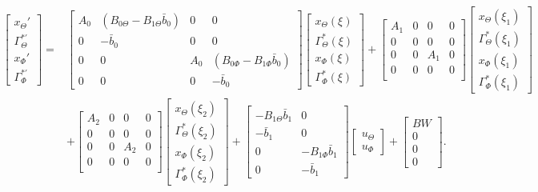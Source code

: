 \documentclass[main.tex]{subfiles}
\begin{document}
\begin{align}
\begin{bmatrix}
x_\Theta' \\
\Gamma_\Theta^{*'} \\
x_\Phi' \\
\Gamma_\Phi^{*'} 
\end{bmatrix} =&
\begin{bmatrix}
A_0 & (B_{0\Theta} - B_{1\Theta} \bar{b}_0) & 0 & 0\\
0 & -\bar{b}_0 & 0 & 0 \\
0 & 0 & A_0 & (B_{0\Phi} - B_{1\Phi} \bar{b}_0)\\
0 & 0 & 0 & -\bar{b}_0
\end{bmatrix}
\begin{bmatrix}
x_\Theta(\xi) \\
\Gamma_\Theta^{*}(\xi) \\
x_\Phi(\xi) \\
\Gamma_\Phi^{*} (\xi)
\end{bmatrix} + 
\begin{bmatrix}
A_1 & 0 & 0 & 0\\
0 & 0 & 0 & 0 \\
0 & 0 & A_1 & 0 \\
0 & 0 & 0 & 0 \\
\end{bmatrix}
\begin{bmatrix}
x_\Theta(\xi_1) \\
\Gamma_\Theta^{*}(\xi_1) \\
x_\Phi(\xi_1) \\
\Gamma_\Phi^{*} (\xi_1)
\end{bmatrix} \nonumber\\ 
&+\begin{bmatrix}
A_2 & 0 & 0 & 0 \\
0 & 0 & 0 & 0 \\
0 & 0 & A_2 & 0 \\
0 & 0 & 0 & 0 \\
\end{bmatrix}
\begin{bmatrix}
x_\Theta(\xi_2) \\
\Gamma_\Theta^{*}(\xi_2) \\
x_\Phi(\xi_2) \\
\Gamma_\Phi^{*} (\xi_2)
\end{bmatrix} +
\begin{bmatrix}
-B_{1\Theta}\bar{b}_1 & 0 \\
-\bar{b}_1 & 0 \\
0 & -B_{1\Phi}\bar{b}_1 \\
0 & -\bar{b}_1
\end{bmatrix}
\begin{bmatrix}
u_\Theta \\
u_\Phi
\end{bmatrix} +
\begin{bmatrix}
BW \\
0 \\
0 \\
0
\end{bmatrix}.
\end{align}
\end{document}
